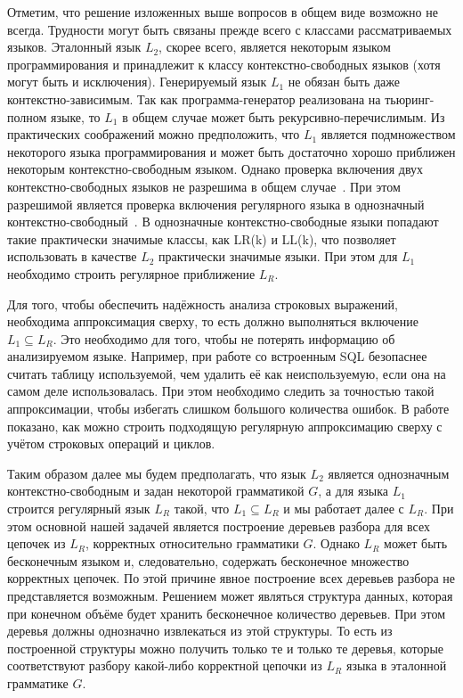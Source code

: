 Отметим, что решение изложенных выше вопросов в общем виде возможно не всегда. Трудности могут быть связаны прежде всего с классами рассматриваемых языков. Эталонный язык $L_2$, скорее всего, является некоторым языком программирования и принадлежит к классу контекстно-свободных языков (хотя могут быть и исключения). Генерируемый язык $L_1$ не обязан быть даже контекстно-зависимым. Так как программа-генератор реализована на тьюринг-полном языке, то $L_1$ в общем случае может быть рекурсивно-перечислимым. Из практических соображений можно предположить, что $L_1$ является подмножеством некоторого языка программирования и может быть достаточно хорошо приближен некоторым контекстно-свободным языком. Однако проверка включения двух контекстно-свободных языков не разрешима в общем случае~\cite{LangIncusion}. При этом разрешимой является проверка включения регулярного языка в однозначный контекстно-свободный~\cite{LangIncusion}. В однозначные контекстно-свободные языки попадают такие практически значимые классы, как LR(k) и LL(k), что позволяет использовать в качестве $L_2$ практически значимые языки. При этом для $L_1$ необходимо строить регулярное приближение $L_R$.

Для того, чтобы обеспечить надёжность анализа строковых выражений, необходима аппроксимация сверху, то есть должно выполняться включение $L_1 \subseteq L_R$. Это необходимо для того, чтобы не потерять информацию об анализируемом языке. Например, при работе со встроенным SQL безопаснее считать таблицу используемой, чем удалить её как неиспользуемую, если она на самом деле использовалась. При этом необходимо следить за точностью такой аппроксимации, чтобы избегать слишком большого количества ошибок. В работе~\cite{RegOverApprox} показано, как можно строить подходящую регулярную аппроксимацию сверху с учётом строковых операций и циклов.

Таким образом далее мы будем предполагать, что язык $L_2$ является однозначным контекстно-свободным и задан некоторой грамматикой $G$, а для языка $L_1$ строится регулярный язык $L_R$ такой, что $L_1 \subseteq L_R$ и мы работает далее с $L_R$. При этом основной нашей задачей является построение деревьев разбора для всех цепочек из $L_R$, корректных относительно грамматики $G$. Однако $L_R$ может быть бесконечным языком и, следовательно, содержать бесконечное множество корректных цепочек. По этой причине явное построение всех деревьев разбора не представляется возможным. Решением может являться структура данных, которая при конечном объёме будет хранить бесконечное количество деревьев. При этом деревья должны однозначно извлекаться из этой структуры. То есть из построенной структуры можно получить только те и только те деревья, которые соответствуют разбору какой-либо корректной цепочки из $L_R$ языка в эталонной грамматике $G$.

